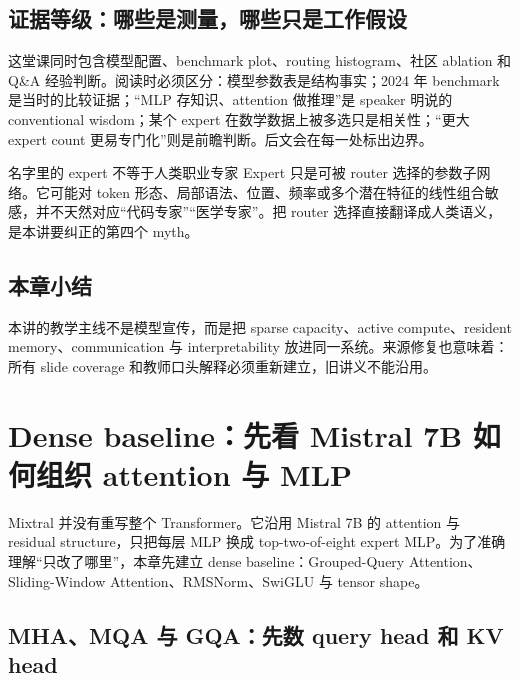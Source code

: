 \documentclass[a4paper]{article}
\begin{document}

\subsection{证据等级：哪些是测量，哪些只是工作假设}

这堂课同时包含模型配置、benchmark plot、routing histogram、社区 ablation 和 Q\&A 经验判断。阅读时必须区分：模型参数表是结构事实；2024 年 benchmark 是当时的比较证据；“MLP 存知识、attention 做推理”是 speaker 明说的 conventional wisdom；某个 expert 在数学数据上被多选只是相关性；“更大 expert count 更易专门化”则是前瞻判断。后文会在每一处标出边界。

\begin{warningbox}{名字里的 expert 不等于人类职业专家}
Expert 只是可被 router 选择的参数子网络。它可能对 token 形态、局部语法、位置、频率或多个潜在特征的线性组合敏感，并不天然对应“代码专家”“医学专家”。把 router 选择直接翻译成人类语义，是本讲要纠正的第四个 myth。
\end{warningbox}

\subsection{本章小结}

本讲的教学主线不是模型宣传，而是把 sparse capacity、active compute、resident memory、communication 与 interpretability 放进同一系统。来源修复也意味着：所有 slide coverage 和教师口头解释必须重新建立，旧讲义不能沿用。

\section{Dense baseline：先看 Mistral 7B 如何组织 attention 与 MLP}

Mixtral 并没有重写整个 Transformer。它沿用 Mistral 7B 的 attention 与 residual structure，只把每层 MLP 换成 top-two-of-eight expert MLP。为了准确理解“只改了哪里”，本章先建立 dense baseline：Grouped-Query Attention、Sliding-Window Attention、RMSNorm、SwiGLU 与 tensor shape。

\subsection{MHA、MQA 与 GQA：先数 query head 和 KV head}
\end{document}
